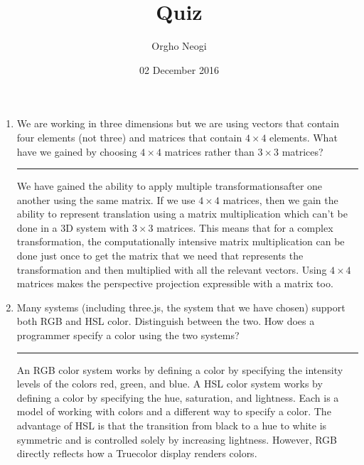 \documentclass[oneside]{article}
\title{Quiz}
\author{Orgho Neogi}
\date{02 December 2016}
\newenvironment{answer}
  {\vspace*{0.2cm} \rule{12cm}{0.02cm} \vspace*{0.2cm}}
  {\vspace*{0.2cm}}
\begin{document}
\maketitle

\begin{enumerate}
  \item We are working in three dimensions but we are
    using vectors that contain four elements (not three)
    and matrices that contain $4 \times 4$ elements.
    What have we gained by choosing $4 \times 4$ matrices
    rather than $3 \times 3$ matrices?

  \begin{answer}

  We have gained the ability to apply multiple transformationsafter one another using the same matrix.
  If we use $4 \times 4$ matrices, then we gain the ability to represent translation using a matrix multiplication
  which can't be done in a 3D system with $3 \times 3$ matrices. This means that for a complex transformation, the computationally
  intensive matrix multiplication can be done just once to get the matrix that we need that represents the transformation
  and then multiplied with all the relevant vectors. Using $4 \times 4$ matrices makes the perspective projection
  expressible with a matrix too.

    \end{answer}

  \item Many systems (including three.js, the system that we have
    chosen) support both RGB and HSL color. Distinguish between
    the two. How does a programmer specify a color using the
    two systems?

  \begin{answer}

  An RGB color system works by defining a color by specifying the intensity levels of the colors red, green, and blue.
  A HSL color system works by defining a color by specifying the hue, saturation, and lightness.
  Each is a model of working with colors and a different way to specify a color.
  The advantage of HSL is that the transition from black to a hue to white is symmetric and is controlled solely by increasing lightness.
  However, RGB directly reflects how a Truecolor display renders colors.

    \end{answer}


\end{enumerate}
\end{document}
